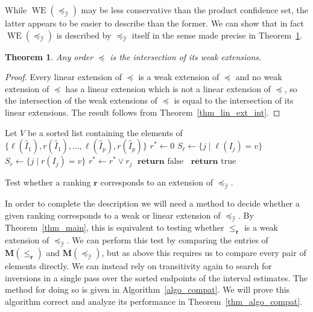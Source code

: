 \documentclass[12pt]{article}
\newcommand{\true}{\operatorname{true}}
\newcommand{\false}{\operatorname{false}}
\newcommand{\return}[1]{\textbf{return }#1}
\newcommand{\mat}[1]{\mathbf{M}(#1)}
\newcommand{\iord}{{\preceq_{\hat{\mathcal{I}}}}}
\newcommand{\rord}[1][\mathbf{r}]{{\leqslant_{#1}}}
\newcommand{\WE}[1]{\operatorname{WE}(#1)}
\newtheorem{theorem}{Theorem}
\numberwithin{theorem}{section}
\begin{document}
While $\WE{\iord}$ may be less conservative than the product confidence set, the latter appears to be easier to describe than the former.  We can show that in fact $\WE{\iord}$ is described by $\iord$ itself in the sense made precise in Theorem~\ref{thm_weak_ext_int}.

\begin{theorem}
\label{thm_weak_ext_int}
Any order $\preceq$ is the intersection of its weak extensions.
\end{theorem}
\begin{proof}
Every linear extension of $\preceq$ is a weak extension of $\preceq$ and no weak extension of $\preceq$ has a linear extension which is not a linear extension of $\preceq$, so the intersection of the weak extensions of $\preceq$ is equal to the intersection of its linear extensions.  The result follows from Theorem~\ref{thm_lin_ext_int}.
\end{proof}

\begin{algorithm}[t]
\begin{algorithmic}
  \State Let $V$ be a sorted list containing the elements of $\{\ell(\hat{I}_1), r(\hat{I}_1), \dots, \ell(\hat{I}_p), r(\hat{I}_p)\}$
  \State $r^* \gets 0$
    \State $S_\ell \gets \{j \mid \ell(I_j) = v\}$
    \State $S_r \gets \{j \mid r(I_j) = v\}$
      \State $r^* \gets r^* \vee r_j$
    \EndFor
        \State $\return{\false}$
      \EndIf
    \EndFor
  \EndFor
  \State $\return{\true}$
\EndProcedure
\end{algorithmic}
\caption{Test whether a ranking $\mathbf{r}$ corresponds to an extension of $\iord$.}
\label{algo_compat}
\end{algorithm}

In order to complete the description we will need a method to decide whether a given ranking corresponds to a weak or linear extension of $\iord$.  By Theorem~\ref{thm_main}, this is equivalent to testing whether $\rord$ is a weak extension of $\iord$.  We can perform this test by comparing the entries of $\mathbf{M}(\rord)$ and $\mat{\iord}$, but as above this requires us to compare every pair of elements directly.  We can instead rely on transitivity again to search for inversions in a single pass over the sorted endpoints of the interval estimates.  The method for doing so is given in Algorithm~\ref{algo_compat}.  We will prove this algorithm correct and analyze its performance in Theorem~\ref{thm_algo_compat}.
\end{document}
